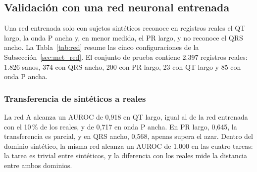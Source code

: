 \begin{spacing}{1.5}
\subsection{Validación con una red neuronal entrenada}\label{sec:res_red}

Una red entrenada solo con sujetos sintéticos reconoce en registros reales el QT largo, la onda P ancha y, en menor medida, el PR largo, y no reconoce el QRS ancho. La Tabla~\ref{tab:red} resume las cinco configuraciones de la Subsección~\ref{sec:met_red}. El conjunto de prueba contiene 2.397 registros reales: 1.826 sanos, 374 con QRS ancho, 200 con PR largo, 23 con QT largo y 85 con onda P ancha.

\begin{table}[H]
\centering
{}
\caption{AUROC sobre los registros reales de prueba de PTB-XL (\emph{folds} 9 y 10), media $\pm$ desviación estándar sobre tres semillas. Con solo 23 casos, el intervalo de confianza del QT largo es amplio: para A, de 0,88 a 0,96 en la primera semilla.}
\label{tab:red}
\end{table}

\subsubsection{Transferencia de sintéticos a reales}

La red A alcanza un AUROC de 0,918 en QT largo, igual al de la red entrenada con el 10\,\% de los reales, y de 0,717 en onda P ancha. En PR largo, 0,645, la transferencia es parcial, y en QRS ancho, 0,568, apenas supera el azar. Dentro del dominio sintético, la misma red alcanza un AUROC de 1,000 en las cuatro tareas: la tarea es trivial entre sintéticos, y la diferencia con los reales mide la distancia entre ambos dominios.


\end{spacing}
